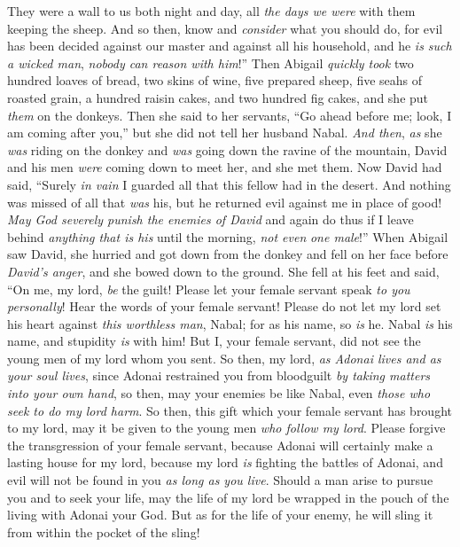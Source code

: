 \begin{biblechapter}
\verse They were a wall to us both night and day, all \textit{the days we were} with them keeping the sheep.
\verse And so then, know and \textit{consider} what you should do, for evil has been decided against our master and against all his household, and he \textit{is such} \textit{a wicked man}, \textit{nobody can reason with him}!”
\verse Then Abigail \textit{quickly took} two hundred loaves of bread, two skins of wine, five prepared sheep, five seahs of roasted grain, a hundred raisin cakes, and two hundred fig cakes, and she put \textit{them} on the donkeys.
\verse Then she said to her servants, “Go ahead before me; look, I am coming after you,” but she did not tell her husband Nabal.
\verse \textit{And then}, \textit{as} she \textit{was} riding on the donkey and \textit{was} going down the ravine of the mountain, David and his men \textit{were} coming down to meet her, and she met them.
\verse Now David had said, “Surely \textit{in vain} I guarded all that this fellow had in the desert. And nothing was missed of all that \textit{was} his, but he returned evil against me in place of good!
\verse \textit{May God severely punish the enemies of David} and again do thus if I leave behind \textit{anything that is his} until the morning, \textit{not even} \textit{one male}!”
\verse When Abigail saw David, she hurried and got down from the donkey and fell on her face before \textit{David’s anger}, and she bowed down to the ground.
\verse She fell at his feet and said, “On me, my lord, \textit{be} the guilt! Please let your female servant speak \textit{to you personally}! Hear the words of your female servant!
\verse Please do not let my lord set his heart against \textit{this worthless man}, Nabal; for as his name, so \textit{is} he. Nabal \textit{is} his name, and stupidity \textit{is} with him! But I, your female servant, did not see the young men of my lord whom you sent.
\verse So then, my lord, \textit{as Adonai lives and as your soul lives}, since Adonai restrained you from bloodguilt \textit{by taking matters into your own hand}, so then, may your enemies be like Nabal, even \textit{those who seek to do my lord harm}.
\verse So then, this gift which your female servant has brought to my lord, may it be given to the young men \textit{who follow my lord}.
\verse Please forgive the transgression of your female servant, because Adonai will certainly make a lasting house for my lord, because my lord \textit{is} fighting the battles of Adonai, and evil will not be found in you \textit{as long as you live}.
\verse Should a man arise to pursue you and to seek your life, may the life of my lord be wrapped in the pouch of the living with Adonai your God. But as for the life of your enemy, he will sling it from within the pocket of the sling!

\end{biblechapter}

